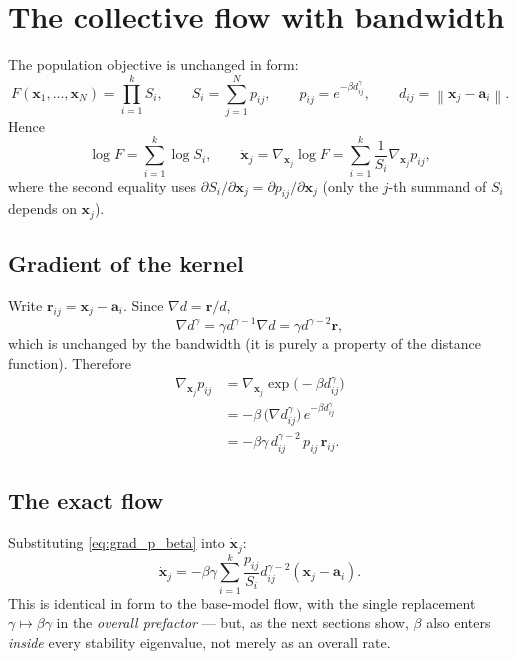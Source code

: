 \documentclass[11pt,a4paper]{article}
\theoremstyle{plain}
\theoremstyle{definition}
\theoremstyle{remark}
\newcommand{\bx}{\bm{x}}
\newcommand{\ba}{\bm{a}}
\newcommand{\br}{\bm{r}}
\newcommand{\norm}[1]{\left\lVert #1\right\rVert}
\newcommand{\bw}{\beta}
\begin{document}
\section{The collective flow with bandwidth}
\label{sec:model}

The population objective is unchanged in form:
\[
  F(\bx_1,\ldots,\bx_N)=\prod_{i=1}^{k}S_i,
  \qquad
  S_i=\sum_{j=1}^{N}p_{ij},
  \qquad
  p_{ij}=e^{-\bw d_{ij}^{\gamma}},
  \qquad
  d_{ij}=\norm{\bx_j-\ba_i}.
\]
Hence
\[
  \log F=\sum_{i=1}^{k}\log S_i,
  \qquad
  \dot{\bx}_j=\nabla_{\bx_j}\log F=\sum_{i=1}^{k}\frac{1}{S_i}\nabla_{\bx_j}p_{ij},
\]
where the second equality uses $\partial S_i/\partial\bx_j=\partial
p_{ij}/\partial \bx_j$ (only the $j$-th summand of $S_i$ depends on $\bx_j$).

\subsection{Gradient of the kernel}

Write $\br_{ij}=\bx_j-\ba_i$. Since $\nabla d=\br/d$,
\[
  \nabla d^{\gamma}=\gamma d^{\gamma-1}\nabla d=\gamma d^{\gamma-2}\br,
\]
which is unchanged by the bandwidth (it is purely a property of the distance
function). Therefore
\begin{align}
  \nabla_{\bx_j}p_{ij}
  &=
  \nabla_{\bx_j}\exp\!\big(-\bw d_{ij}^{\gamma}\big)
  \nonumber\\
  &=
  -\bw\,\big(\nabla d_{ij}^{\gamma}\big)\,e^{-\bw d_{ij}^{\gamma}}
  \nonumber\\
  &=
  -\bw\gamma\, d_{ij}^{\gamma-2}\,p_{ij}\,\br_{ij}.
  \label{eq:grad_p_beta}
\end{align}

\subsection{The exact flow}

Substituting \eqref{eq:grad_p_beta} into $\dot{\bx}_j$:
\begin{equation}
  \boxed{
  \dot{\bx}_j
  =
  -\bw\gamma
  \sum_{i=1}^{k}
  \frac{p_{ij}}{S_i}
  d_{ij}^{\gamma-2}
  (\bx_j-\ba_i).
  }
  \label{eq:exact_gradient_beta}
\end{equation}
This is identical in form to the base-model flow, with the single
replacement $\gamma\mapsto\bw\gamma$ in the \emph{overall prefactor} — but,
as the next sections show, $\bw$ also enters \emph{inside} every stability
eigenvalue, not merely as an overall rate.
\end{document}
